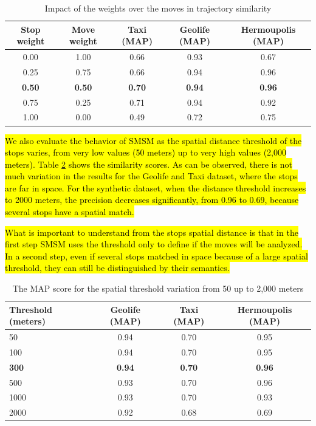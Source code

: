 \documentclass[12pt]{article}
\begin{document}
\begin{table}[ht!]
  \scriptsize
  \centering
  \begin{tabular}{|c|c|c|c|c|}
  	\hline
Stop weight & Move weight & Taxi (MAP) & Geolife (MAP) & Hermoupolis (MAP) \\
  	\hline
0.00 & 1.00 & 0.66 & 0.93 & 0.67\\
0.25 & 0.75 & 0.66 & 0.94 & 0.96\\
\textbf{0.50} & \textbf{0.50} & \textbf{0.70} & \textbf{0.94} & \textbf{0.96}\\
0.75 & 0.25 & 0.71 & 0.94 & 0.92\\
1.00 & 0.00 & 0.49 & 0.72 & 0.75 \\
    \hline
  \end{tabular}
  \caption{Impact of the weights over the moves in trajectory similarity}
  \label{tab:sensibility_stopmove}
\end{table}

\hl{We also evaluate the behavior of SMSM as the spatial distance threshold of the stops varies, from very low values (50 meters) up to very high values (2,000 meters). Table {\ref{tab:sensibility_spatial_thresholds}} shows the similarity scores. As can be observed, there is not much variation in the results for the Geolife and Taxi dataset, where the stops are far in space. For the synthetic dataset, when the distance threshold increases to 2000 meters, the precision decreases significantly, from 0.96 to 0.69, because several stops have a spatial match.}

\hl{What is important to understand from the stops spatial distance is that in the first step SMSM uses the threshold only to define if the moves will be analyzed. In a second step, even if several stops matched in space because of a large spatial threshold, they can still be distinguished by their semantics.}



\begin{table}[ht!]
  \scriptsize
  \centering
  \begin{tabular}{|l|c|c|c|}
  	\hline
Threshold (meters) & Geolife (MAP) & Taxi (MAP) & Hermoupolis (MAP)\\
  	\hline
50 & {0.94} & 0.70 & 0.95\\
100 & {0.94} & 0.70 & 0.95\\
\textbf{300} & \textbf{0.94} & \textbf{0.70} & \textbf{0.96} \\
500 & 0.93 & 0.70 & {0.96}\\
1000 & 0.93 & 0.70 & 0.93\\
2000 & 0.92 & 0.68 & 0.69\\
    \hline
  \end{tabular}
  \caption{The MAP score for the spatial threshold variation from 50 up to 2,000 meters}
  \label{tab:sensibility_spatial_thresholds}
\end{table}
\end{document}
